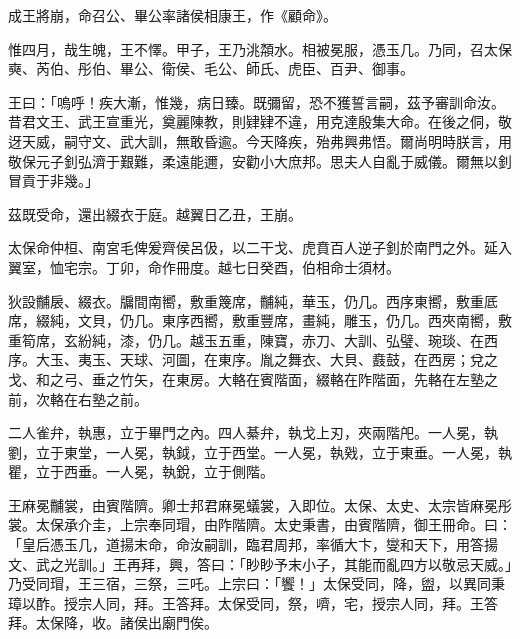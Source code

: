 
\begin{pinyinscope}
成王將崩，命召公、畢公率諸侯相康王，作《顧命》。

惟四月，哉生魄，王不懌。甲子，王乃洮頮水。相被冕服，憑玉几。乃同，召太保奭、芮伯、彤伯、畢公、衛侯、毛公、師氏、虎臣、百尹、御事。

王曰：「嗚呼！疾大漸，惟幾，病日臻。既彌留，恐不獲誓言嗣，茲予審訓命汝。昔君文王、武王宣重光，奠麗陳教，則肄肄不違，用克達殷集大命。在後之侗，敬迓天威，嗣守文、武大訓，無敢昏逾。今天降疾，殆弗興弗悟。爾尚明時朕言，用敬保元子釗弘濟于艱難，柔遠能邇，安勸小大庶邦。思夫人自亂于威儀。爾無以釗冒貢于非幾。」

茲既受命，還出綴衣于庭。越翼日乙丑，王崩。

太保命仲桓、南宮毛俾爰齊侯呂伋，以二干戈、虎賁百人逆子釗於南門之外。延入翼室，恤宅宗。丁卯，命作冊度。越七日癸酉，伯相命士須材。

狄設黼扆、綴衣。牖間南嚮，敷重篾席，黼純，華玉，仍几。西序東嚮，敷重厎席，綴純，文貝，仍几。東序西嚮，敷重豐席，畫純，雕玉，仍几。西夾南嚮，敷重筍席，玄紛純，漆，仍几。越玉五重，陳寶，赤刀、大訓、弘璧、琬琰、在西序。大玉、夷玉、天球、河圖，在東序。胤之舞衣、大貝、鼖鼓，在西房；兌之戈、和之弓、垂之竹矢，在東房。大輅在賓階面，綴輅在阼階面，先輅在左塾之前，次輅在右塾之前。

二人雀弁，執惠，立于畢門之內。四人綦弁，執戈上刃，夾兩階戺。一人冕，執劉，立于東堂，一人冕，執鉞，立于西堂。一人冕，執戣，立于東垂。一人冕，執瞿，立于西垂。一人冕，執銳，立于側階。

王麻冕黼裳，由賓階隮。卿士邦君麻冕蟻裳，入即位。太保、太史、太宗皆麻冕彤裳。太保承介圭，上宗奉同瑁，由阼階隮。太史秉書，由賓階隮，御王冊命。曰：「皇后憑玉几，道揚末命，命汝嗣訓，臨君周邦，率循大卞，燮和天下，用答揚文、武之光訓。」王再拜，興，答曰：「眇眇予末小子，其能而亂四方以敬忌天威。」乃受同瑁，王三宿，三祭，三吒。上宗曰：「饗！」太保受同，降，盥，以異同秉璋以酢。授宗人同，拜。王答拜。太保受同，祭，嚌，宅，授宗人同，拜。王答拜。太保降，收。諸侯出廟門俟。


\end{pinyinscope}